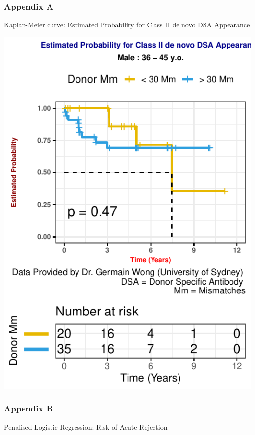 \documentclass[a4paper,9pt,twocolumn,twoside,]{pinp}
\begin{document}
\hypertarget{appendix-a}{%
\subsubsection{Appendix A}\label{appendix-a}}

Kaplan-Meier curve: Estimated Probability for Class II de novo DSA
Appearance

\begin{center}\includegraphics{Executive_Report_files/figure-latex/eplet-1} \end{center}

\hypertarget{appendix-b}{%
\subsubsection{Appendix B}\label{appendix-b}}

Penalised Logistic Regression: Risk of Acute Rejection
\end{document}
